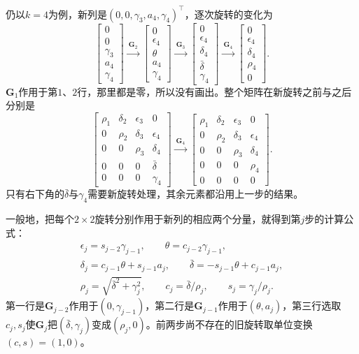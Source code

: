 仍以$k=4$为例，新列是$(0,0,\gamma_3,a_4,\gamma_4)^\top$，逐次旋转的变化为
\[
 \begin{bmatrix}0\\0\\\gamma_3\\a_4\\\gamma_4\end{bmatrix}
 \xrightarrow{\ \bm G_2\ }
 \begin{bmatrix}0\\\epsilon_4\\\theta\\a_4\\\gamma_4\end{bmatrix}
 \xrightarrow{\ \bm G_3\ }
 \begin{bmatrix}0\\\epsilon_4\\\delta_4\\\bar\delta\\\gamma_4\end{bmatrix}
 \xrightarrow{\ \bm G_4\ }
 \begin{bmatrix}0\\\epsilon_4\\\delta_4\\\rho_4\\0\end{bmatrix}.
\]
$\bm G_1$作用于第$1$、$2$行，那里都是零，所以没有画出。整个矩阵在新旋转之前与之后分别是
\[
 \begin{bmatrix}
 \rho_1&\delta_2&\epsilon_3&0\\
 0&\rho_2&\delta_3&\epsilon_4\\
 0&0&\rho_3&\delta_4\\
 0&0&0&\bar\delta\\
 0&0&0&\gamma_4
 \end{bmatrix}
 \xrightarrow{\ \bm G_4\ }
 \begin{bmatrix}
 \rho_1&\delta_2&\epsilon_3&0\\
 0&\rho_2&\delta_3&\epsilon_4\\
 0&0&\rho_3&\delta_4\\
 0&0&0&\rho_4\\
 0&0&0&0
 \end{bmatrix}.
\]
只有右下角的$\bar\delta$与$\gamma_4$需要新旋转处理，其余元素都沿用上一步的结果。

一般地，把每个$2\times2$旋转分别作用于新列的相应两个分量，就得到第$j$步的计算公式：
\begin{equation}
 \begin{gathered}
 \epsilon_j=s_{j-2}\gamma_{j-1},\qquad \theta=c_{j-2}\gamma_{j-1},\\
 \delta_j=c_{j-1}\theta+s_{j-1}a_j,\qquad
 \bar\delta=-s_{j-1}\theta+c_{j-1}a_j,\\
 \rho_j=\sqrt{\bar\delta^2+\gamma_j^2},\qquad
 c_j=\bar\delta/\rho_j,\qquad s_j=\gamma_j/\rho_j .
 \end{gathered}
 \label{eq:ls-minres-rotation}
\end{equation}
第一行是$\bm G_{j-2}$作用于$(0,\gamma_{j-1})$，第二行是$\bm G_{j-1}$作用于$(\theta,a_j)$，第三行选取$c_j,s_j$使$\bm G_j$把$(\bar\delta,\gamma_j)$变成$(\rho_j,0)$。前两步尚不存在的旧旋转取单位变换$(c,s)=(1,0)$。

